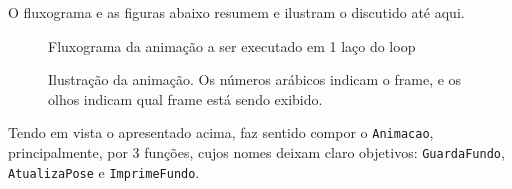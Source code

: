 \documentclass[10pt, a4paper, twoside]{article}
\begin{document}
            O fluxograma e as figuras abaixo resumem e ilustram o discutido até aqui.
            \begin{figure}[H]\centering
                \caption{Fluxograma da animação a ser executado em 1 laço do loop}
                
            \end{figure}
            \begin{figure}[H]\centering
                \caption{
                    Ilustração da animação.
                    Os números arábicos indicam o frame, e os olhos indicam qual frame está sendo exibido.
                }
                
            \end{figure}
            Tendo em vista o apresentado acima, faz sentido compor o {\tt Animacao}, principalmente, por 3 funções, cujos nomes deixam claro objetivos:
            {\tt GuardaFundo},
            {\tt AtualizaPose} e
            {\tt ImprimeFundo}. 
            
            \medskip
            
\end{document}
